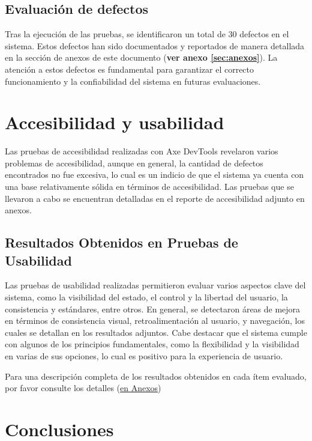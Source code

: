 \documentclass[stu, 12pt, letterpaper, donotrepeattitle, floatsintext, natbib]{apa7}
\begin{document}
\subsection{Evaluación de defectos}

Tras la ejecución de las pruebas, se identificaron un total de 30 defectos en el sistema. Estos defectos han sido documentados y reportados de manera detallada en la sección de anexos de este documento (\textbf{ver anexo \ref{sec:anexos}}). La atención a estos defectos es fundamental para garantizar el correcto funcionamiento y la confiabilidad del sistema en futuras evaluaciones. 


\newpage

\section{Accesibilidad y usabilidad}

Las pruebas de accesibilidad realizadas con Axe DevTools revelaron varios problemas de accesibilidad, aunque en general, la cantidad de defectos encontrados no fue excesiva, lo cual es un indicio de que el sistema ya cuenta con una base relativamente sólida en términos de accesibilidad. Las pruebas que se llevaron a cabo se encuentran detalladas en el reporte de accesibilidad adjunto en anexos.
\subsection{Resultados Obtenidos en Pruebas de Usabilidad}

Las pruebas de usabilidad realizadas permitieron evaluar varios aspectos clave del sistema, como la visibilidad del estado, el control y la libertad del usuario, la consistencia y estándares, entre otros. En general, se detectaron áreas de mejora en términos de consistencia visual, retroalimentación al usuario, y navegación, los cuales se detallan en los resultados adjuntos. Cabe destacar que el sistema cumple con algunos de los principios fundamentales, como la flexibilidad y la visibilidad en varias de sus opciones, lo cual es positivo para la experiencia de usuario.

\noindent Para una descripción completa de los resultados obtenidos en cada ítem evaluado, por favor consulte los detalles (\hyperref[tab:reporte_usabilidad]{en Anexos})

\newpage
\section{Conclusiones}
\end{document}
